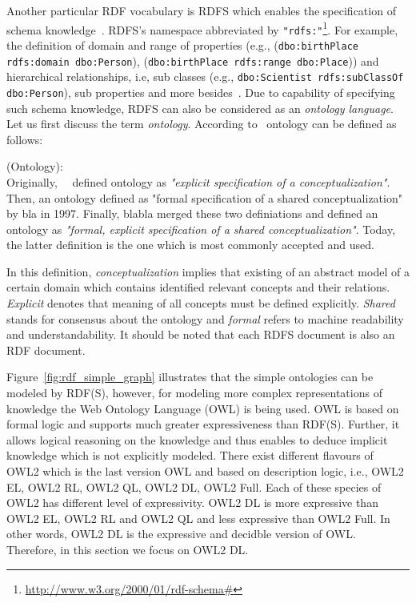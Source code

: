 \par Another particular RDF vocabulary is RDFS which enables the specification of schema knowledge~\cite{DBLP:books/crc/Hitzler2010}. RDFS's namespace abbreviated by \texttt{"rdfs:"}\footnote{\url{http://www.w3.org/2000/01/rdf-schema#}}. For example, the definition of domain and range of properties (e.g., (\texttt{dbo:birthPlace rdfs:domain dbo:Person}), (\texttt{dbo:birthPlace rdfs:range dbo:Place})) and hierarchical relationships, i.e, sub classes (e.g., \texttt{dbo:Scientist rdfs:subClassOf dbo:Person}), sub properties and more besides~\cite{DBLP:books/crc/Hitzler2010}. Due to capability of specifying such schema knowledge, RDFS can also be considered as an \textit{ontology language}. Let us first discuss the term \textit{ontology}. According to~\citeauthor{gruber1993translation} ontology can be defined as follows:
\begin{definition}{(Ontology):\\}
Originally,~\citeauthor{gruber1993translation}~\citeyear{gruber1993translation} defined ontology as \textit{"explicit specification of a conceptualization"}. Then, an ontology defined as "formal specification of a shared conceptualization" by bla in 1997. Finally, blabla merged these two definiations and defined an ontology as \textit{"formal, explicit specification of a shared conceptualization"}. Today, the latter definition is the one which is most commonly accepted and used.
\end{definition}
In this definition, \textit{conceptualization} implies that existing of an abstract model of a certain domain which contains identified relevant concepts and their relations. \textit{Explicit} denotes that meaning of all concepts must be defined explicitly. \textit{Shared} stands for consensus about the ontology and \textit{formal} refers to machine readability and understandability. It should be noted that each RDFS document is also an RDF document.


Figure~\ref{fig:rdf_simple_graph} illustrates that the simple ontologies can be modeled by RDF(S), however, for modeling more complex representations of knowledge the Web Ontology Language (OWL) is being used. OWL is based on formal logic and supports much greater expressiveness than RDF(S). Further, it allows logical reasoning on the knowledge and thus enables to deduce implicit knowledge which is not explicitly modeled. There exist different flavours of OWL2 which is the last version OWL and based on description logic, i.e., OWL2 EL, OWL2 RL, OWL2 QL, OWL2 DL, OWL2 Full. Each of these species of OWL2 has different level of expressivity. OWL2 DL is more expressive than OWL2 EL, OWL2 RL and OWL2 QL and less expressive than OWL2 Full.
In other words, OWL2 DL is the expressive and decidble version of OWL. Therefore, in this section we focus on OWL2 DL.

